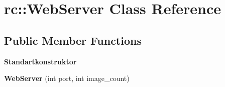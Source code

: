 \hypertarget{classrc_1_1WebServer}{\section{rc\+:\+:Web\+Server Class Reference}
\label{classrc_1_1WebServer}
}
\subsection*{Public Member Functions}
\begin{Indent}{\bf Standartkonstruktor}\par
\begin{DoxyCompactItemize}
\item 
\hypertarget{classrc_1_1WebServer_afe32b4a720bb672a01b7e290507ae33e}{{\bfseries Web\+Server} (int port, int image\+\_\+count)}\label{classrc_1_1WebServer_afe32b4a720bb672a01b7e290507ae33e}

\end{DoxyCompactItemize}
\end{Indent}
